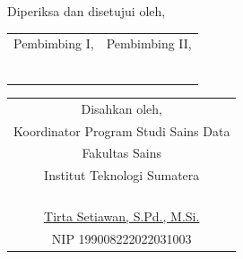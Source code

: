 \begin{center}
	\centering Diperiksa dan disetujui oleh,
	\vspace{2em} %
	\justify
    \setlength{\tabcolsep}{0pt}
    \begin{tabular}{p{}p{}}
        \multicolumn{1}{c}{Pembimbing I,} & \multicolumn{1}{c}{Pembimbing II,} \\
        & \\
        & \\
        & \\
        & \\
		\multicolumn{1}{c}{\underline{\printnamadosbinga}} & \multicolumn{1}{c}{\underline{\printnamadosbingb}} \\
		\multicolumn{1}{c}{\printnipdosbinga} & \multicolumn{1}{c}{\printnipdosbingb} \\
    \end{tabular}
	\vfill

	\centering 
	\begin{tabular}{c}
		Disahkan oleh,\\
		Koordinator Program Studi Sains Data\\
		Fakultas Sains\\
		Institut Teknologi Sumatera
		\\
		\\
		\\
		\\
		\\
		\underline{Tirta Setiawan, S.Pd., M.Si.} \\ %
		NIP 199008222022031003 \\
	\end{tabular}
	
\end{center}
\clearpage
